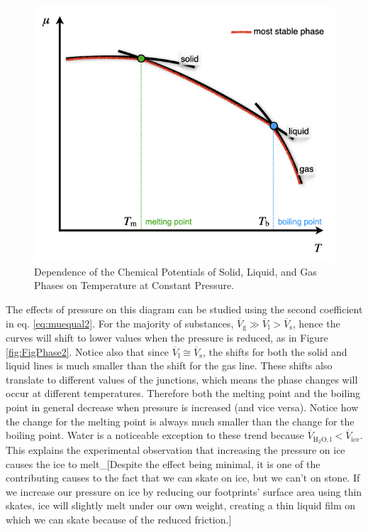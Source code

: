 \documentclass[
  9pt,
]{extbook}
\theoremstyle{definition}
\theoremstyle{definition}
\theoremstyle{definition}
\theoremstyle{remark}
\begin{document}
\begin{figure}

{\centering \includegraphics[width=0.6\linewidth]{./img/OEP_Figures.016} 

}

\caption{Dependence of the Chemical Potentials of Solid, Liquid, and Gas Phases on Temperature at Constant Pressure.}\label{fig:FigPhase1}
\end{figure}

The effects of pressure on this diagram can be studied using the second coefficient in eq. \eqref{eq:muequal2}. For the majority of substances, \(\overline{V}_{\text{g}} \gg \overline{V}_{\text{l}} > \overline{V}_{\text{s}}\), hence the curves will shift to lower values when the pressure is reduced, as in Figure \ref{fig:FigPhase2}. Notice also that since \(\overline{V}_{\text{l}} \cong \overline{V}_{\text{s}}\), the shifts for both the solid and liquid lines is much smaller than the shift for the gas line. These shifts also translate to different values of the junctions, which means the phase changes will occur at different temperatures. Therefore both the melting point and the boiling point in general decrease when pressure is increased (and vice versa). Notice how the change for the melting point is always much smaller than the change for the boiling point.
Water is a noticeable exception to these trend because \(\overline{V}_{\mathrm{H}_2\mathrm{O,l}} < \overline{V}_{\text{ice}}\). This explains the experimental observation that increasing the pressure on ice causes the ice to melt\_{[}Despite the effect being minimal, it is one of the contributing causes to the fact that we can skate on ice, but we can't on stone. If we increase our pressure on ice by reducing our footprints' surface area using thin skates, ice will slightly melt under our own weight, creating a thin liquid film on which we can skate because of the reduced friction.{]}
\end{document}
